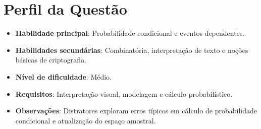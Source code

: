 \documentclass[a4paper,12pt]{article}
\begin{document}
\section*{Perfil da Questão}
\begin{itemize}
  \item \textbf{Habilidade principal}: Probabilidade condicional e eventos dependentes.
  \item \textbf{Habilidades secundárias}: Combinatória, interpretação de texto e noções básicas de criptografia.
  \item \textbf{Nível de dificuldade}: Médio.
  \item \textbf{Requisitos}: Interpretação visual, modelagem e cálculo probabilístico.
  \item \textbf{Observações}: Distratores exploram erros típicos em cálculo de probabilidade condicional e atualização do espaço amostral.
\end{itemize}
\end{document}
